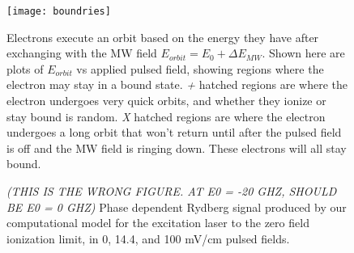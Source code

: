 \documentclass[aps,pra,preprint,groupedaddress]{revtex4-1}
\begin{document}
\begin{figure}
	\texttt{[image: boundries]}
	\caption{\label{fig:bound} Electrons execute an orbit based on the energy they have after exchanging with the MW field $E_{orbit} = E_0 + \Delta E_{MW}$. Shown here are plots of $E_{orbit}$ vs applied pulsed field, showing regions where the electron may stay in a bound state. \emph{+} hatched regions are where the electron undergoes very quick orbits, and whether they ionize or stay bound is random. \emph{X} hatched regions are where the electron undergoes a long orbit that won't return until after the pulsed field is off and the MW field is ringing down. These electrons will all stay bound.}
\end{figure}

\begin{figure}
	\caption{\emph{(THIS IS THE WRONG FIGURE. AT E0 = -20 GHZ, SHOULD BE E0 = 0 GHZ)} Phase dependent Rydberg signal produced by our computational model for the excitation laser to the zero field ionization limit, in 0, 14.4, and 100 mV/cm pulsed fields.}
	\label{fig:SimModAbove}
\end{figure}


\end{document}
